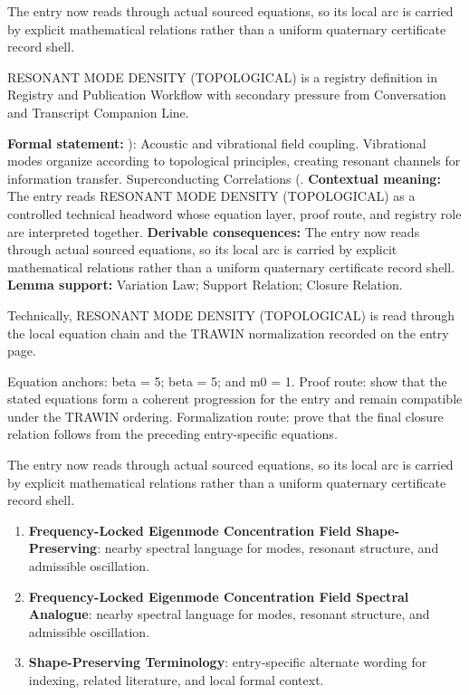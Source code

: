 The entry now reads through actual sourced equations, so its local arc is carried by explicit mathematical relations rather than a uniform quaternary certificate record shell.
\clearpage


\begingroup\small
{}
RESONANT MODE DENSITY (TOPOLOGICAL) is a registry definition in Registry and Publication Workflow with secondary pressure from Conversation and Transcript Companion Line.

\begingroup\footnotesize\setlength{\emergencystretch}{3em}\sloppy
\textbf{Formal statement:} ): Acoustic and vibrational field coupling. Vibrational modes organize according to topological principles, creating resonant channels for information transfer. Superconducting Correlations (. \textbf{Contextual meaning:} The entry reads RESONANT MODE DENSITY (TOPOLOGICAL) as a controlled technical headword whose equation layer, proof route, and registry role are interpreted together. \textbf{Derivable consequences:} The entry now reads through actual sourced equations, so its local arc is carried by explicit mathematical relations rather than a uniform quaternary certificate record shell. \textbf{Lemma support:} Variation Law; Support Relation; Closure Relation.\par
\endgroup

Technically, RESONANT MODE DENSITY (TOPOLOGICAL) is read through the local equation chain and the TRAWIN normalization recorded on the entry page.

Equation anchors: beta = 5; beta = 5; and m0 = 1. Proof route: show that the stated equations form a coherent progression for the entry and remain compatible under the TRAWIN ordering. Formalization route: prove that the final closure relation follows from the preceding entry-specific equations.

The entry now reads through actual sourced equations, so its local arc is carried by explicit mathematical relations rather than a uniform quaternary certificate record shell.
\endgroup

\begin{enumerate}[leftmargin=1.6em,itemsep=6pt,topsep=4pt]
\item \textbf{Frequency-Locked Eigenmode Concentration Field Shape-Preserving}: nearby spectral language for modes, resonant structure, and admissible oscillation.
\item \textbf{Frequency-Locked Eigenmode Concentration Field Spectral Analogue}: nearby spectral language for modes, resonant structure, and admissible oscillation.
\item \textbf{Shape-Preserving Terminology}: entry-specific alternate wording for indexing, related literature, and local formal context.
\end{enumerate}


